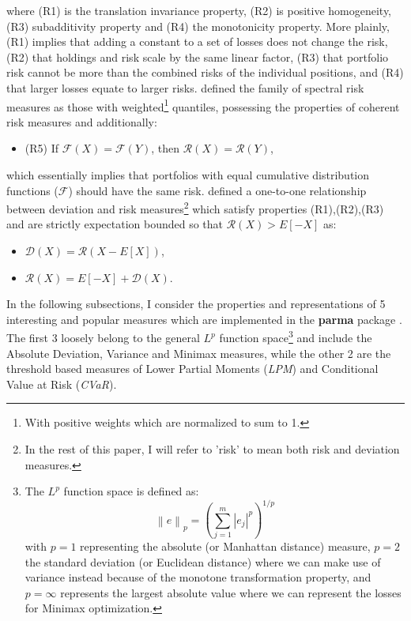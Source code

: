 where (R1) is the translation invariance property, (R2) is positive
homogeneity, (R3) subadditivity property and (R4) the monotonicity property.
More plainly, (R1) implies that adding a constant to a set of losses does not
change the risk, (R2) that holdings and risk scale by the same linear factor,
(R3) that portfolio risk cannot be more than the combined risks of the
individual positions, and (R4) that larger losses equate to larger risks.
\citet{Acerbi2002a} defined the family of spectral risk measures as
those with weighted\footnote{With positive weights which are normalized to sum to 1.}
quantiles, possessing the properties of coherent risk measures and additionally:
\begin{itemize}
\item (R5) If $\mathcal{F}\left( X \right)=\mathcal{F}\left( Y \right)$, then $\mathcal{R}\left( X \right)=\mathcal{R}\left( Y \right)$,
\end{itemize}
which essentially implies that portfolios with equal cumulative distribution
functions ($\mathcal{F}$) should have the same risk.
\citet{Rockafellar2006} defined a one-to-one relationship between
deviation and risk measures\footnote{In the rest of this paper, I will refer
to 'risk' to mean both risk and deviation measures.} which satisfy properties
(R1),(R2),(R3) and are strictly expectation bounded so that
$\mathcal{R}(X)>E\left[-X\right]$ as:
\begin{itemize}
\item $\mathcal{D}\left( X \right)=\mathcal{R}\left( {X - E\left[ X \right]} \right)$,
\item $\mathcal{R}\left( X \right)=E\left[ { - X} \right] + \mathcal{D}\left( X \right)$.
\end{itemize}
In the following subsections, I consider the properties and representations
of 5 interesting and popular measures which are implemented in the
\textbf{parma} package . The first 3 loosely belong to the general $L^p$
function space\footnote{The $L^p$ function space is defined as:
\begin{equation}
{\left\| e \right\|_p}={\left( {\sum\limits_{j=1}^m {{{\left| {{e_j}} \right|}^p}} } \right)^{1/p}}
\end{equation}
with $p=1$ representing the absolute (or Manhattan distance) measure, $p=2$
the  standard deviation (or Euclidean distance) where we can make use of
variance instead because of the monotone transformation property, and
$p=\infty$ represents the largest absolute value where we can represent the
losses for Minimax optimization.} and include the Absolute Deviation,
Variance and Minimax measures, while the other 2 are the threshold based
measures of Lower Partial Moments (\emph{LPM}) and Conditional Value at Risk
(\emph{CVaR}).
